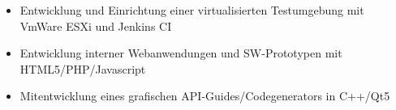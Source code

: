 \divider

\begin{itemize}  
  \item Entwicklung und Einrichtung einer virtualisierten Testumgebung mit VmWare ESXi und Jenkins CI
  \item Entwicklung interner Webanwendungen und SW-Prototypen mit HTML5/PHP/Javascript
  \item Mitentwicklung eines grafischen API-Guides/Codegenerators in C++/Qt5
\end{itemize}